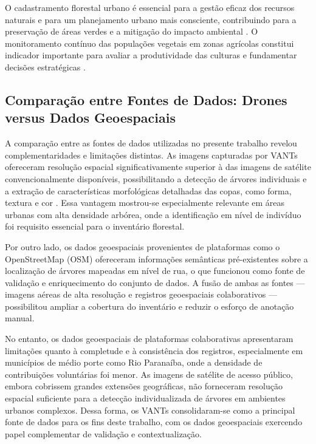 \documentclass[
    12pt,
    openright,
    oneside,
    a4paper,
    sumario=tradicional,
    english,
    brazil,
    ]{abntex2}
\begin{document}
O cadastramento florestal urbano é essencial para a gestão eficaz dos recursos naturais e para um planejamento urbano mais consciente, contribuindo para a preservação de áreas verdes e a mitigação do impacto ambiental \cite{barbosa2018quantificaccao}. O monitoramento contínuo das populações vegetais em zonas agrícolas constitui indicador importante para avaliar a produtividade das culturas e fundamentar decisões estratégicas \cite{sa2021detecccao}.

\subsection{Comparação entre Fontes de Dados: Drones versus Dados Geoespaciais}

A comparação entre as fontes de dados utilizadas no presente trabalho revelou complementaridades e limitações distintas. As imagens capturadas por VANTs ofereceram resolução espacial significativamente superior à das imagens de satélite convencionalmente disponíveis, possibilitando a detecção de árvores individuais e a extração de características morfológicas detalhadas das copas, como forma, textura e cor \cite{wu2024fine}. Essa vantagem mostrou-se especialmente relevante em áreas urbanas com alta densidade arbórea, onde a identificação em nível de indivíduo foi requisito essencial para o inventário florestal.

Por outro lado, os dados geoespaciais provenientes de plataformas como o OpenStreetMap (OSM) ofereceram informações semânticas pré-existentes sobre a localização de árvores mapeadas em nível de rua, o que funcionou como fonte de validação e enriquecimento do conjunto de dados. A fusão de ambas as fontes --- imagens aéreas de alta resolução e registros geoespaciais colaborativos --- possibilitou ampliar a cobertura do inventário e reduzir o esforço de anotação manual.

No entanto, os dados geoespaciais de plataformas colaborativas apresentaram limitações quanto à completude e à consistência dos registros, especialmente em municípios de médio porte como Rio Paranaíba, onde a densidade de contribuições voluntárias foi menor. As imagens de satélite de acesso público, embora cobrissem grandes extensões geográficas, não forneceram resolução espacial suficiente para a detecção individualizada de árvores em ambientes urbanos complexos. Dessa forma, os VANTs consolidaram-se como a principal fonte de dados para os fins deste trabalho, com os dados geoespaciais exercendo papel complementar de validação e contextualização.
\end{document}
